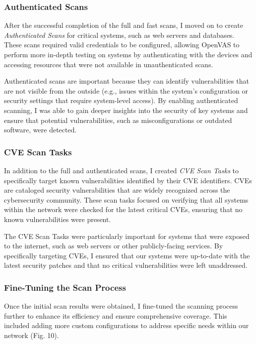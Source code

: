 \documentclass[twocolumn]{article}
\begin{document}
\subsubsection{Authenticated Scans}

After the successful completion of the full and fast scans, I moved on to create \textit{Authenticated Scans} for critical systems, such as web servers and databases. These scans required valid credentials to be configured, allowing OpenVAS to perform more in-depth testing on systems by authenticating with the devices and accessing resources that were not available in unauthenticated scans.

Authenticated scans are important because they can identify vulnerabilities that are not visible from the outside (e.g., issues within the system's configuration or security settings that require system-level access). By enabling authenticated scanning, I was able to gain deeper insights into the security of key systems and ensure that potential vulnerabilities, such as misconfigurations or outdated software, were detected.

\subsubsection{CVE Scan Tasks}

In addition to the full and authenticated scans, I created \textit{CVE Scan Tasks} to specifically target known vulnerabilities identified by their CVE identifiers. CVEs are cataloged security vulnerabilities that are widely recognized across the cybersecurity community. These scan tasks focused on verifying that all systems within the network were checked for the latest critical CVEs, ensuring that no known vulnerabilities were present.

The CVE Scan Tasks were particularly important for systems that were exposed to the internet, such as web servers or other publicly-facing services. By specifically targeting CVEs, I ensured that our systems were up-to-date with the latest security patches and that no critical vulnerabilities were left unaddressed.

\subsubsection{Fine-Tuning the Scan Process}

Once the initial scan results were obtained, I fine-tuned the scanning process further to enhance its efficiency and ensure comprehensive coverage. This included adding more custom configurations to address specific needs within our network (Fig. 10).
\end{document}
